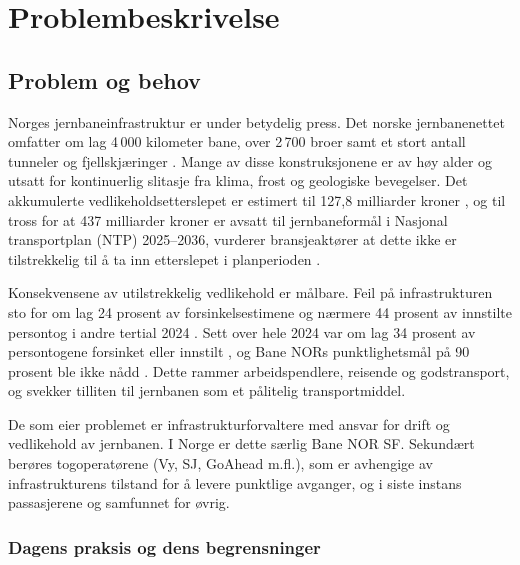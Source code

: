 \section{Problembeskrivelse}
\subsection{Problem og behov}

Norges jernbaneinfrastruktur er under betydelig press. Det norske jernbanenettet omfatter om lag 4\,000 kilometer bane, over 2\,700 broer samt et stort antall tunneler og fjellskjæringer \parencite{jernbanedirektoratet_tall}. Mange av disse konstruksjonene er av høy alder og utsatt for kontinuerlig slitasje fra klima, frost og geologiske bevegelser. Det akkumulerte vedlikeholdsetterslepet er estimert til 127,8 milliarder kroner \parencite{banenor_infrastatus_2024}, og til tross for at 437 milliarder kroner er avsatt til jernbaneformål i Nasjonal transportplan (NTP) 2025--2036, vurderer bransjeaktører at dette ikke er tilstrekkelig til å ta inn etterslepet i planperioden \parencite{jernbanedirektoratet_ntp_2025}.

Konsekvensene av utilstrekkelig vedlikehold er målbare. Feil på infrastrukturen sto for om lag 24 prosent av forsinkelsestimene og nærmere 44 prosent av innstilte persontog i andre tertial 2024 \parencite{jernbanedirektoratet_gjennomforingsplan_2025}. Sett over hele 2024 var om lag 34 prosent av persontogene forsinket eller innstilt \parencite{vg_tog_2025}, og Bane NORs punktlighetsmål på 90 prosent ble ikke nådd \parencite{banenor_punktlighet_2025}. Dette rammer arbeidspendlere, reisende og godstransport, og svekker tilliten til jernbanen som et pålitelig transportmiddel.

De som eier problemet er infrastrukturforvaltere med ansvar for drift og vedlikehold av jernbanen. I Norge er dette særlig Bane NOR SF. Sekundært berøres togoperatørene (Vy, SJ, GoAhead m.fl.), som er avhengige av infrastrukturens tilstand for å levere punktlige avganger, og i siste instans passasjerene og samfunnet for øvrig.

\subsubsection{Dagens praksis og dens begrensninger}

